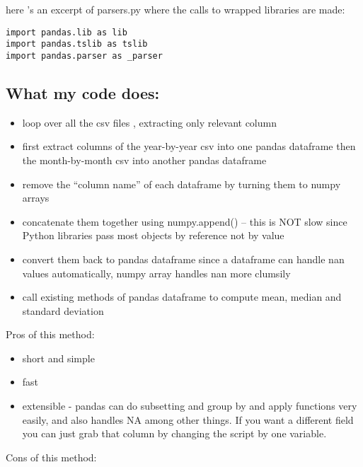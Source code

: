 \documentclass[letterpaper,10pt,english]{/usr/local/lib/python2.7/dist-packages/sphinx/texinputs/sphinxhowto}
\begin{document}
here 's an excerpt of parsers.py where the calls to wrapped libraries
are made:\begin{verbatim}
import pandas.lib as lib
import pandas.tslib as tslib
import pandas.parser as _parser
\end{verbatim}\subsection{What my code does:}\begin{itemize}
\itemsep1pt\parskip0pt
\item
  loop over all the csv files , extracting only relevant column
\item
  first extract columns of the year-by-year csv into one pandas
  dataframe then the month-by-month csv into another pandas dataframe
\item
  remove the ``column name'' of each dataframe by turning them to numpy
  arrays
\item
  concatenate them together using numpy.append() -- this is NOT slow
  since Python libraries pass most objects by reference not by value
\item
  convert them back to pandas dataframe since a dataframe can handle nan
  values automatically, numpy array handles nan more clumsily
\item
  call existing methods of pandas dataframe to compute mean, median and
  standard deviation
\end{itemize}Pros of this method:

\begin{itemize}
\itemsep1pt\parskip0pt
\item
  short and simple
\item
  fast
\item
  extensible - pandas can do subsetting and group by and apply functions
  very easily, and also handles NA among other things. If you want a
  different field you can just grab that column by changing the script
  by one variable.
\end{itemize}

Cons of this method:
\end{document}
